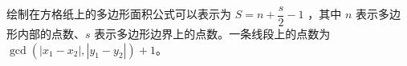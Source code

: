 绘制在方格纸上的多边形面积公式可以表示为 $S=n+\dfrac{s}{2}-1$ ，其中 $n$ 表示多边形内部的点数、$s$ 表示多边形边界上的点数。一条线段上的点数为 $\gcd(|x_1-x_2|,|y_1-y_2|)+1$。